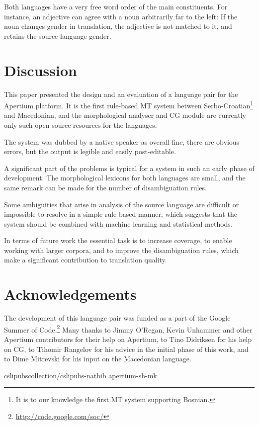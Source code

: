 \documentclass{book}
\begin{document}
Both languages have a very free word order of the main constituents. For instance, an 
adjective can agree with a noun arbitrarily far to the left:
If the noun 
changes gender in translation, the adjective is not matched to it, and retains
the source language gender.

\section{Discussion}
This paper presented the design and an evaluation of a language pair for the Apertium platform.
It is the first rule-based MT system between Serbo-Croatian\footnote{It is to our knowledge the first 
MT system supporting Bosnian.} and Macedonian, and the morphological
analyser and CG module are currently only such open-source resources for the languages.

The system was dubbed by a native speaker as overall fine, there are obvious errors, but the output is legible and easily post-editable. 

A significant part of the problems is typical for a system in such an early phase of 
development. The morphological lexicons for both languages are small, and 
the same remark can be made for the number of disambiguation rules. 

Some ambiguities that arise in analysis of the source language are 
difficult or impossible to resolve in a simple rule-based manner, which suggests that 
the system should be combined with machine learning and statistical methods.

In terms of future work the essential task is to increase coverage, to enable working
with larger corpora, and to improve the disambiguation rules, which make a significant
contribution to translation quality.

\section*{Acknowledgements}
The development of this language pair was funded as a part of the 
Google Summer of Code.\footnote{\url{http://code.google.com/soc/}}
Many thanks to Jimmy O'Regan, Kevin Unhammer and other Apertium contributors for
their help on Apertium, to Tino Didriksen for his help on CG, to Tihomir Rangelov
for his advice in the initial phase of this work, and to Dime Mitrevski
for his input on the Macedonian language.

 {cslipubscollection/cslipubs-natbib}
 {apertium-sh-mk}

\backmatter
\end{document}
